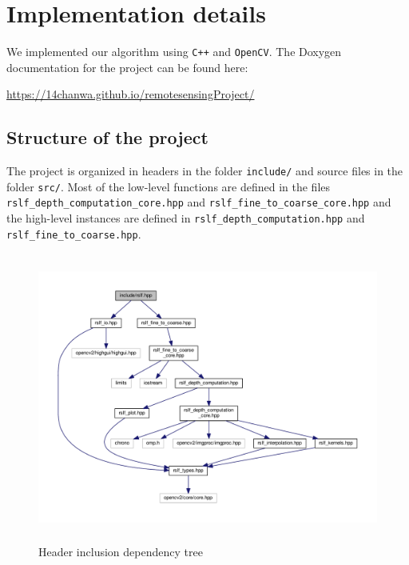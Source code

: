 \documentclass{article}
\theoremstyle{definition}
\begin{document}






\appendix
\section{Implementation details}


We implemented our algorithm using \verb#C++# and \verb#OpenCV#. The Doxygen documentation for the project can be found here:
\begin{center}
 \url{https://14chanwa.github.io/remotesensingProject/}
\end{center}


\subsection{Structure of the project}


The project is organized in headers in the folder \verb#include/# and source files in the folder \verb#src/#. Most of the low-level functions are defined in the files \verb#rslf_depth_computation_core.hpp# and \verb#rslf_fine_to_coarse_core.hpp# and the high-level instances are defined in \verb#rslf_depth_computation.hpp# and \verb#rslf_fine_to_coarse.hpp#.


\begin{figure}[ht]
  \centering
  \includegraphics[height=9.5cm, trim=0cm 1cm 0cm 1cm, clip]{drawings/rslf_8hpp__incl.pdf}
  \caption{Header inclusion dependency tree}
  \label{fig:header:dependancy}
\end{figure}
\end{document}
